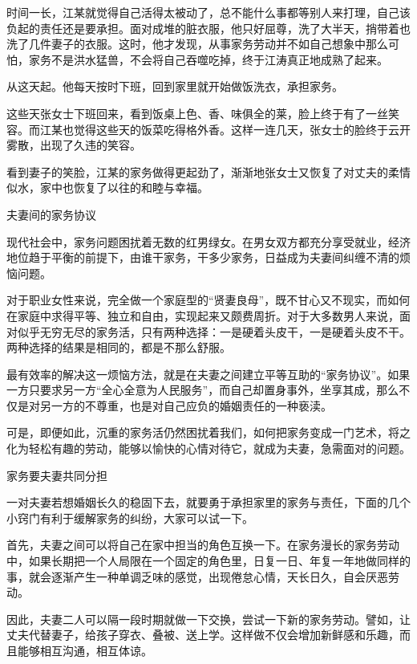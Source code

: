 \documentclass[12pt,UTF8]{ctexbook}
\begin{document}
时间一长，江某就觉得自己活得太被动了，总不能什么事都等别人来打理，自己该负起的责任还是要承担。面对成堆的脏衣服，他只好屈尊，洗了大半天，捎带着也洗了几件妻子的衣服。这时，他才发现，从事家务劳动并不如自己想象中那么可怕，家务不是洪水猛兽，不会将自己吞噬吃掉，终于江涛真正地成熟了起来。

从这天起。他每天按时下班，回到家里就开始做饭洗衣，承担家务。

这些天张女士下班回来，看到饭桌上色、香、味俱全的莱，脸上终于有了一丝笑容。而江某也觉得这些天的饭菜吃得格外香。这样一连几天，张女士的脸终于云开雾散，出现了久违的笑容。

看到妻子的笑脸，江某的家务做得更起劲了，渐渐地张女士又恢复了对丈夫的柔情似水，家中也恢复了以往的和睦与幸福。





夫妻间的家务协议


现代社会中，家务问题困扰着无数的红男绿女。在男女双方都充分享受就业，经济地位趋于平衡的前提下，由谁干家务，干多少家务，日益成为夫妻间纠缠不清的烦恼问题。

对于职业女性来说，完全做一个家庭型的“贤妻良母”，既不甘心又不现实，而如何在家庭中求得平等、独立和自由，实现起来又颇费周折。对于大多数男人来说，面对似乎无穷无尽的家务活，只有两种选择：一是硬着头皮干，一是硬着头皮不干。两种选择的结果是相同的，都是不那么舒服。

最有效率的解决这一烦恼方法，就是在夫妻之间建立平等互助的“家务协议”。如果一方只要求另一方“全心全意为人民服务”，而自己却置身事外，坐享其成，那么不仅是对另一方的不尊重，也是对自己应负的婚姻责任的一种亵渎。

可是，即便如此，沉重的家务活仍然困扰着我们，如何把家务变成一门艺术，将之化为轻松有趣的劳动，能够以愉快的心情对待它，就成为夫妻，急需面对的问题。





家务要夫妻共同分担


一对夫妻若想婚姻长久的稳固下去，就要勇于承担家里的家务与责任，下面的几个小窍门有利于缓解家务的纠纷，大家可以试一下。

首先，夫妻之间可以将自己在家中担当的角色互换一下。在家务漫长的家务劳动中，如果长期把一个人局限在一个固定的角色里，日复一日、年复一年地做同样的事，就会逐渐产生一种单调乏味的感觉，出现倦怠心情，天长日久，自会厌恶劳动。

因此，夫妻二人可以隔一段时期就做一下交换，尝试一下新的家务劳动。譬如，让丈夫代替妻子，给孩子穿衣、叠被、送上学。这样做不仅会增加新鲜感和乐趣，而且能够相互沟通，相互体谅。
\end{document}
